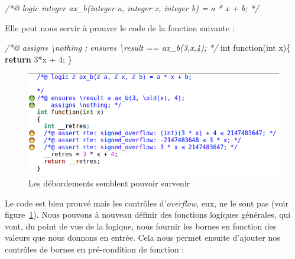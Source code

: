 \documentclass[12pt,francais,]{scrbook}
\newenvironment{Shaded}{}{}
\newcommand{\KeywordTok}[1]{\textcolor[rgb]{0.00,0.44,0.13}{\textbf{{#1}}}}
\newcommand{\DataTypeTok}[1]{\textcolor[rgb]{0.56,0.13,0.00}{{#1}}}
\newcommand{\DecValTok}[1]{\textcolor[rgb]{0.25,0.63,0.44}{{#1}}}
\newcommand{\CommentTok}[1]{\textcolor[rgb]{0.38,0.63,0.69}{\textit{{#1}}}}
\newcommand{\NormalTok}[1]{{#1}}
\begin{document}
\begin{footnotesize}\begin{Shaded}
\begin{Highlighting}[]
\CommentTok{/*@}
\CommentTok{  logic integer ax_b(integer a, integer x, integer b) =}
\CommentTok{    a * x + b;}
\CommentTok{*/}
\end{Highlighting}
\end{Shaded}\end{footnotesize}

Elle peut nous servir à prouver le code de la fonction suivante :

\begin{footnotesize}\begin{Shaded}
\begin{Highlighting}[]
\CommentTok{/*@ }
\CommentTok{  assigns \textbackslash{}nothing ;}
\CommentTok{  ensures \textbackslash{}result == ax_b(3,x,4); }
\CommentTok{*/}
\DataTypeTok{int} \NormalTok{function(}\DataTypeTok{int} \NormalTok{x)\{}
  \KeywordTok{return} \DecValTok{3}\NormalTok{*x + }\DecValTok{4}\NormalTok{;}
\NormalTok{\}}
\end{Highlighting}
\end{Shaded}\end{footnotesize}

\begin{figure}[htbp]
\centering
\includegraphics[scale=0.5]{4-3-affine-1.png}
\caption{Les débordements semblent pouvoir survenir}
\label{fig:4-3-affine-1}
\end{figure}

Le code est bien prouvé mais les contrôles d'\emph{overflow}, eux, ne le
sont pas (voir figure~\ref{fig:4-3-affine-1}). Nous pouvons à nouveau
définir des fonctions logiques
générales, qui vont, du point de vue de la logique, nous fournir les
bornes en fonction des valeurs que nous donnons en entrée. Cela nous
permet ensuite d'ajouter nos contrôles de bornes en pré-condition de
fonction :
\end{document}
